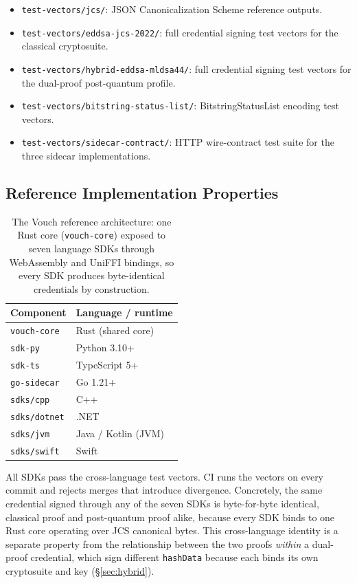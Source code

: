 \documentclass[11pt,a4paper]{article}
\begin{document}
\begin{itemize}[leftmargin=*]
\item \verb|test-vectors/jcs/|: JSON Canonicalization Scheme reference outputs.
\item \verb|test-vectors/eddsa-jcs-2022/|: full credential signing test vectors for the classical cryptosuite.
\item \verb|test-vectors/hybrid-eddsa-mldsa44/|: full credential signing test vectors for the dual-proof post-quantum profile.
\item \verb|test-vectors/bitstring-status-list/|: BitstringStatusList encoding test vectors.
\item \verb|test-vectors/sidecar-contract/|: HTTP wire-contract test suite for the three sidecar implementations.
\end{itemize}

\subsection{Reference Implementation Properties}

\begin{table}[h]
\centering
\small
\begin{tabular}{ll}
\toprule
Component & Language / runtime \\
\midrule
\verb|vouch-core| & Rust (shared core) \\
\verb|sdk-py| & Python 3.10+ \\
\verb|sdk-ts| & TypeScript 5+ \\
\verb|go-sidecar| & Go 1.21+ \\
\verb|sdks/cpp| & C++ \\
\verb|sdks/dotnet| & .NET \\
\verb|sdks/jvm| & Java / Kotlin (JVM) \\
\verb|sdks/swift| & Swift \\
\bottomrule
\end{tabular}
\caption{The Vouch reference architecture: one Rust core (\texttt{vouch-core}) exposed to seven language SDKs through WebAssembly and UniFFI bindings, so every SDK produces byte-identical credentials by construction.}
\end{table}

All SDKs pass the cross-language test vectors. CI runs the vectors on every commit and rejects merges that introduce divergence. Concretely, the same credential signed through any of the seven SDKs is byte-for-byte identical, classical proof and post-quantum proof alike, because every SDK binds to one Rust core operating over JCS canonical bytes. This cross-language identity is a separate property from the relationship between the two proofs \emph{within} a dual-proof credential, which sign different \verb|hashData| because each binds its own cryptosuite and key (\S\ref{sec:hybrid}).
\end{document}
